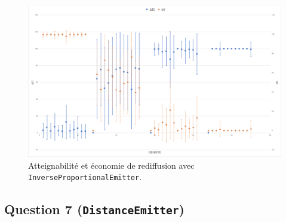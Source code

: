 \documentclass[a4paper]{article}
\begin{document}
\begin{figure}[H]
\begin{minipage}{\textwidth}
  \centering
    \includegraphics[width=\textwidth]{images/ex2x8-2.png}
    \caption{Atteignabilité et économie de rediffusion avec \texttt{InverseProportionalEmitter}.}
\end{minipage}
\end{figure}

\pagebreak

\subsection{Question 7 (\texttt{DistanceEmitter})}
\end{document}
